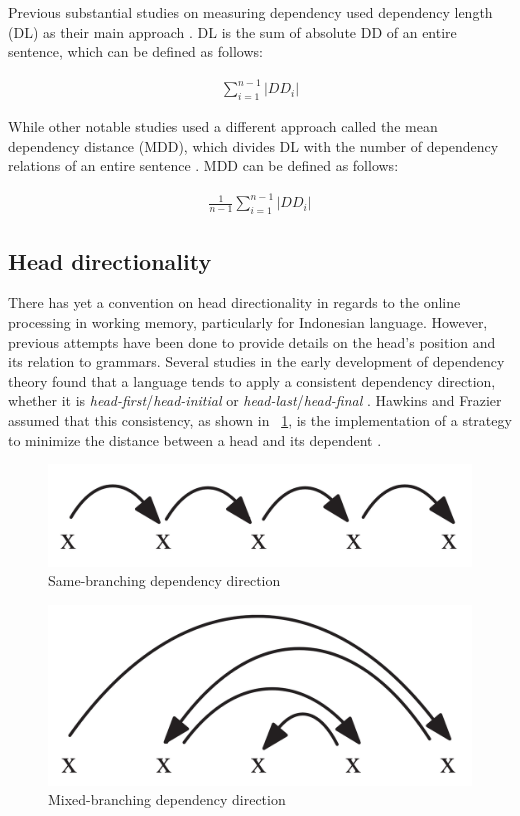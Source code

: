 \documentclass[10pt, a4paper, conference, compsocconf]{IEEEtran}
\begin{document}
Previous substantial studies on measuring dependency used dependency length (DL) as their main approach \cite{gildea2010grammars, futrell2015large}. DL is the sum of absolute DD of an entire sentence, which can be defined as follows:

\begin{align}\label{eq:bola}
	\displaystyle\sum_{i=1}^{n-1} |DD_i|
\end{align}

\noindent While other notable studies used a different approach called the mean dependency distance (MDD), which divides DL with the number of dependency relations of an entire sentence \cite{liu2008dependency, liu2017dependency}. MDD can be defined as follows:

\begin{align}\label{eq:bola}
	\frac{1}{n-1} \displaystyle\sum_{i=1}^{n-1} |DD_i|
\end{align}

\subsection{Head directionality}

There has yet a convention on head directionality in regards to the online processing in working memory, particularly for Indonesian language. However, previous attempts have been done to provide details on the head's position and its relation to grammars. Several studies in the early development of dependency theory found that a language tends to apply a consistent dependency direction, whether it is \textit{head-first}/\textit{head-initial} or \textit{head-last}/\textit{head-final} \cite{hawkins1994performance, radford1997syntactic, vennemann1994linguistic}. Hawkins and Frazier assumed that this consistency, as shown in \pic~\ref{fig:samebranching}, is the implementation of a strategy to minimize the distance between a head and its dependent \cite{hawkins1994performance, frazier1985syntactic}.  

\begin{figure}
	\centering \includegraphics[width=0.3
	\textwidth] {pics/samebranching.png} \caption{Same-branching dependency direction \cite{temperley2008dependency}} 
\label{fig:samebranching} \end{figure}

\begin{figure}
	\centering \includegraphics[width=0.3
	\textwidth] {pics/mixedbranching.png} \caption{Mixed-branching dependency direction \cite{temperley2008dependency}} 
\label{fig:mixedbranching} \end{figure}
\end{document}
